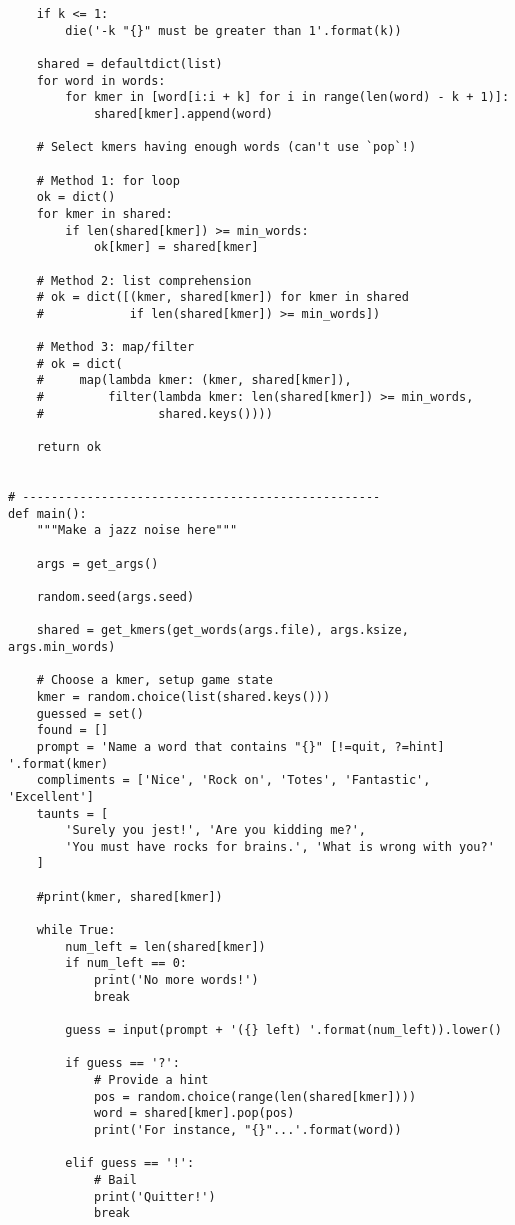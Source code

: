 \documentclass[]{article}
\begin{document}
\begin{verbatim}
    if k <= 1:
        die('-k "{}" must be greater than 1'.format(k))

    shared = defaultdict(list)
    for word in words:
        for kmer in [word[i:i + k] for i in range(len(word) - k + 1)]:
            shared[kmer].append(word)

    # Select kmers having enough words (can't use `pop`!)

    # Method 1: for loop
    ok = dict()
    for kmer in shared:
        if len(shared[kmer]) >= min_words:
            ok[kmer] = shared[kmer]

    # Method 2: list comprehension
    # ok = dict([(kmer, shared[kmer]) for kmer in shared
    #            if len(shared[kmer]) >= min_words])

    # Method 3: map/filter
    # ok = dict(
    #     map(lambda kmer: (kmer, shared[kmer]),
    #         filter(lambda kmer: len(shared[kmer]) >= min_words,
    #                shared.keys())))

    return ok


# --------------------------------------------------
def main():
    """Make a jazz noise here"""

    args = get_args()

    random.seed(args.seed)

    shared = get_kmers(get_words(args.file), args.ksize, args.min_words)

    # Choose a kmer, setup game state
    kmer = random.choice(list(shared.keys()))
    guessed = set()
    found = []
    prompt = 'Name a word that contains "{}" [!=quit, ?=hint] '.format(kmer)
    compliments = ['Nice', 'Rock on', 'Totes', 'Fantastic', 'Excellent']
    taunts = [
        'Surely you jest!', 'Are you kidding me?',
        'You must have rocks for brains.', 'What is wrong with you?'
    ]

    #print(kmer, shared[kmer])

    while True:
        num_left = len(shared[kmer])
        if num_left == 0:
            print('No more words!')
            break

        guess = input(prompt + '({} left) '.format(num_left)).lower()

        if guess == '?':
            # Provide a hint
            pos = random.choice(range(len(shared[kmer])))
            word = shared[kmer].pop(pos)
            print('For instance, "{}"...'.format(word))

        elif guess == '!':
            # Bail
            print('Quitter!')
            break


\end{verbatim}
\end{document}

